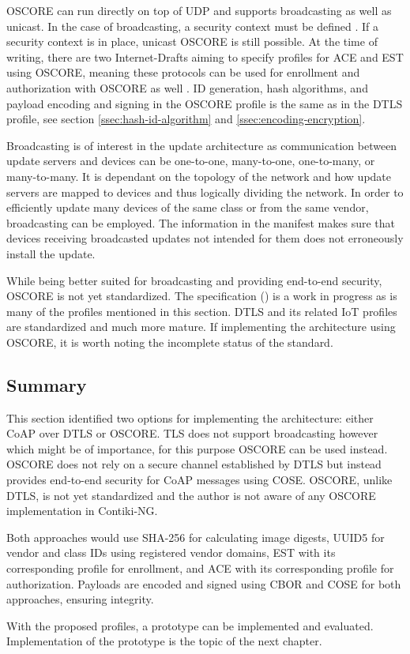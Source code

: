 \documentclass[0-thesis.tex]{subfiles}
\begin{document}
OSCORE can run directly on top of UDP and supports broadcasting as well as unicast. In the
case of broadcasting, a security context must be defined \parencite{oscore-group}. If a
security context is in place, unicast OSCORE is still possible. At the time of writing,
there are two Internet-Drafts aiming to specify profiles for ACE and EST using OSCORE,
meaning these protocols can be used for enrollment and authorization with OSCORE as well
\parencite{ace-oscore, est-oscore}. ID generation, hash algorithms, and payload encoding
and signing in the OSCORE profile is the same as in the DTLS profile, see section
\ref{ssec:hash-id-algorithm} and \ref{ssec:encoding-encryption}.

Broadcasting is of interest in the update architecture as communication between update
servers and devices can be one-to-one, many-to-one, one-to-many, or many-to-many. It is
dependant on the topology of the network and how update servers are mapped to devices and
thus logically dividing the network. In order to efficiently update many devices of the
same class or from the same vendor, broadcasting can be employed. The information in the
manifest makes sure that devices receiving broadcasted updates not intended for them does
not erroneously install the update.

While being better suited for broadcasting and providing end-to-end security, OSCORE is
not yet standardized. The specification (\parencite{oscore}) is a work in progress as is
many of the profiles mentioned in this section. DTLS and its related IoT profiles are
standardized and much more mature. If implementing the architecture using OSCORE, it is
worth noting the incomplete status of the standard.

\subsection{Summary}
\label{sec:profiles-summary}
This section identified two options for implementing the architecture: either CoAP over
DTLS or OSCORE. TLS does not support broadcasting however which might be of importance,
for this purpose OSCORE can be used instead. OSCORE does not rely on a secure channel
established by DTLS but instead provides end-to-end security for CoAP messages using COSE.
OSCORE, unlike DTLS, is not yet standardized and the author is not aware of any OSCORE
implementation in Contiki-NG. 

Both approaches would use SHA-256 for calculating image digests, UUID5 for vendor and
class IDs using registered vendor domains, EST with its corresponding profile for
enrollment, and ACE with its corresponding profile for authorization. Payloads are encoded
and signed using CBOR and COSE for both approaches, ensuring integrity.

With the proposed profiles, a prototype can be implemented and evaluated. Implementation
of the prototype is the topic of the next chapter.
\end{document}
